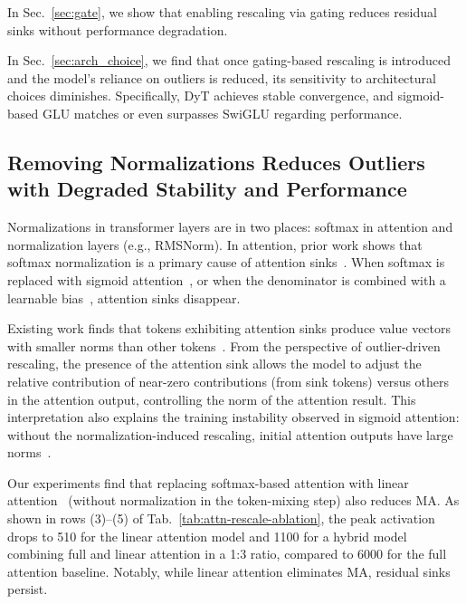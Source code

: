 \documentclass{article} %
\begin{document}
In Sec.~\ref{sec:gate}, we show that enabling rescaling via gating reduces residual sinks without performance degradation.

In Sec.~\ref{sec:arch_choice}, we find that once gating-based rescaling is introduced and the model’s reliance on outliers is reduced, its sensitivity to architectural choices diminishes. 
Specifically, DyT achieves stable convergence, and sigmoid-based GLU matches or even surpasses SwiGLU regarding performance.


\subsection{Removing Normalizations Reduces Outliers with Degraded Stability and Performance}
\label{sec:dyt}

Normalizations in transformer layers are in two places: softmax in attention and normalization layers (e.g., RMSNorm).
In attention, prior work shows that softmax normalization is a primary cause of attention sinks~\citep{gu2024attention,an2025systematic}. 
When softmax is replaced with sigmoid attention~\citep{gu2024attention}, or when the denominator is combined with a learnable bias~\citep{sun2024massive, dong2024hymba, agarwal2025gpt}, attention sinks disappear.  

Existing work finds that tokens exhibiting attention sinks produce value vectors with smaller norms than other tokens~\citep{sun2024massive,an2025systematic}.
From the perspective of outlier-driven rescaling, the presence of the attention sink allows the model to adjust the relative contribution of near-zero contributions (from sink tokens) versus others in the attention output, controlling the norm of the attention result. 
This interpretation also explains the training instability observed in sigmoid attention: without the normalization-induced rescaling, initial attention outputs have large norms~\citep{ramapuram2024theory}. 

Our experiments find that replacing softmax-based attention with linear attention~\citep{yang2024gated} (without normalization in the token-mixing step) also reduces MA.
As shown in rows (3)--(5) of Tab.~\ref{tab:attn-rescale-ablation}, the peak activation drops to 510 for the linear attention model and 1100 for a hybrid model combining full and linear attention in a 1:3 ratio, compared to 6000 for the full attention baseline. Notably, while linear attention eliminates MA, residual sinks persist.
\end{document}
